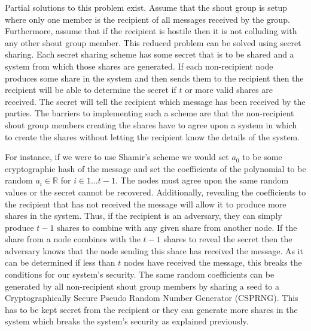 \documentclass[ %
                    author={Luke Murray},
                supervisor={Dr. Simon Hollis},
                     title={Shadow Peer-to-Peer Networks},
                  subtitle={},
                    degree={MEng},
                      year={2013} ]{thesis}
\begin{document}
Partial solutions to this problem exist. Assume that the shout group is setup where only one member is the recipient of all messages received by the group. Furthermore, assume that if the recipient is hostile then it is not colluding with any other shout group member. This reduced problem can be solved using secret sharing. Each secret sharing scheme has some secret that is to be shared and a system from which those shares are generated. If each non-recipient node produces some share in the system and then sends them to the recipient then the recipient will be able to determine the secret if $t$ or more valid shares are received. The secret will tell the recipient which message has been received by the parties. The barriers to implementing such a scheme are that the non-recipient shout group members creating the shares have to agree upon a system in which to create the shares without letting the recipient know the details of the system.

For instance, if we were to use Shamir's scheme\cite{Shamir} we would set $a_0$ to be some cryptographic hash of the message and set the coefficients of the polynomial to be random $a_i \in \mathbb{R}$ for $i \in {1 \ldots t-1}$. The nodes must agree upon the same random values or the secret cannot be recovered. Additionally, revealing the coefficients to the recipient that has not received the message will allow it to produce more shares in the system. Thus, if the recipient is an adversary, they can simply produce $t-1$ shares to combine with any given share from another node. If the share from a node combines with the $t-1$ shares to reveal the secret then the adversary knows that the node sending this share has received the message. As it can be determined if less than $t$ nodes have received the message, this breaks the conditions for our system's security. The same random coefficients can be generated by all non-recipient shout group members by sharing a seed to a Cryptographically Secure Pseudo Random Number Generator (CSPRNG). This has to be kept secret from the recipient or they can generate more shares in the system which breaks the system's security as explained previously.
\end{document}
